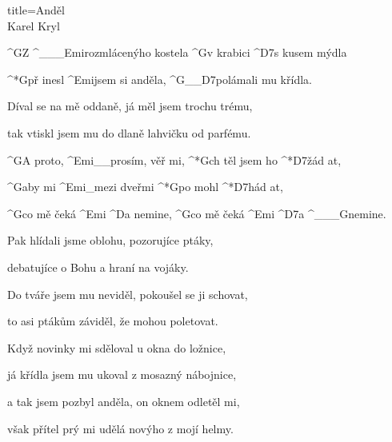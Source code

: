 \begin{song}{title=\predtitle \centering Anděl \\\large Karel Kryl   \vspace*{-0.3cm}}  %
\begin{centerjustified}
\nejnejvetsi
\sloka 
	^{G}Z ^{{\color{white}\_\_\_}Emi}rozmlácenýho kostela ^{G}v krabici ^{D7}s kusem mýdla

	^*{G}př inesl ^{Emi}jsem si anděla, ^{G{\color{white}\_\_}D7}polámali mu křídla.

	Díval se na mě oddaně, já měl jsem trochu trému,

	tak vtiskl jsem mu do dlaně lahvičku od parfému.

	^{G}A proto, ^{Emi{\color{white}\_\_}}prosím, věř mi, ^*{G}ch těl jsem ho ^*{D7}žád at,
	
	^{G}aby mi ^{Emi{\color{white}\_}}mezi dveřmi ^*{G}po mohl ^*{D7}hád at,

	^{G}co mě čeká ^{Emi} ^{D}a nemine, ^{G}co mě čeká ^{Emi} ^{D7}a    ^{{\color{white}\_\_\_}G}nemine.

\sloka
	Pak hlídali jsme oblohu, pozorujíce ptáky,
	
	debatujíce o Bohu a hraní na vojáky.

	Do tváře jsem mu neviděl, pokoušel se ji schovat,

	to asi ptákům záviděl, že mohou poletovat.


\sloka
	Když novinky mi sděloval u okna do ložnice,

	já křídla jsem mu ukoval z mosazný nábojnice,
	
	a tak jsem pozbyl anděla, on oknem odletěl mi,

	však přítel prý mi udělá novýho z mojí helmy.


\end{centerjustified}
\setcounter{Slokočet}{0}
\end{song}

